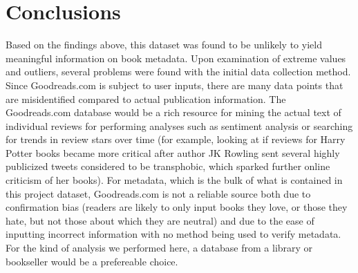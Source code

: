 \documentclass{article}
\begin{document}
\section{Conclusions}
Based on the findings above, this dataset was found to be unlikely to yield meaningful information on book metadata. Upon examination of extreme values and outliers, several problems were found with the initial data collection method. Since Goodreads.com is subject to user inputs, there are many data points that are misidentified compared to actual publication information. The Goodreads.com database would be a rich resource for mining the actual text of individual reviews for performing analyses such as sentiment analysis or searching for trends in review stars over time (for example, looking at if reviews for Harry Potter books became more critical after author JK Rowling sent several highly publicized tweets considered to be transphobic, which sparked further online criticism of her books).
For metadata, which is the bulk of what is contained in this project dataset, Goodreads.com is not a reliable source both due to confirmation bias (readers are likely to only input books they love, or those they hate, but not those about which they are neutral) and due to the ease of inputting incorrect information with no method being used to verify metadata. For the kind of analysis we performed here, a database from a library or bookseller would be a prefereable choice.
\end{document}
